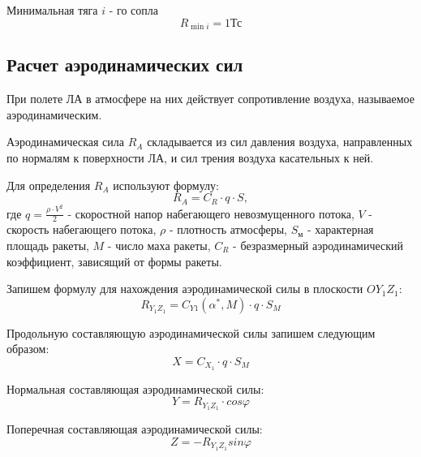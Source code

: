 Минимальная тяга $i$ - го сопла $$R_{\min i} = 1 \text{Тс}$$

\clearpage

\subsection{Расчет аэродинамических сил}
При полете ЛА в атмосфере на них действует сопротивление воздуха, называемое аэродинамическим.

Аэродинамическая сила $R_A$ складывается из сил давления воздуха, направленных по нормалям к поверхности ЛА, и сил трения воздуха касательных к ней. 

Для определения $R_{A}$ используют формулу:
\begin{equation}
	R_{A} = C_{R} \cdot q \cdot S, 
\end{equation}
где $q = \frac{\rho \cdot V^2}{2}$ - скоростной напор набегающего невозмущенного потока, $V$ - скорость набегающего потока, $\rho$ - плотность атмосферы, $S_\text{м}$ - характерная площадь ракеты, $M$ - число маха ракеты, $C_R$ - безразмерный аэродинамический коэффициент, зависящий от формы ракеты.

Запишем формулу для нахождения аэродинамической силы в плоскости $O Y_1 Z_1$:
\begin{equation}
	R_{Y_1 Z_1} = C_{Y1} (\alpha^*, M) \cdot q \cdot S_M
\end{equation}

Продольную составляющую аэродинамической силы запишем следующим образом: 
\begin{equation}
	X = C_{X_1} \cdot q \cdot S_M
\end{equation}

Нормальная составляющая аэродинамической силы:
\begin{equation}
	Y = R_{Y_1 Z_1} \cdot cos \varphi
\end{equation}

Поперечная составляющая аэродинамической силы:
\begin{equation}
	Z = -R_{Y_1 Z_1} sin \varphi
\end{equation}



\clearpage